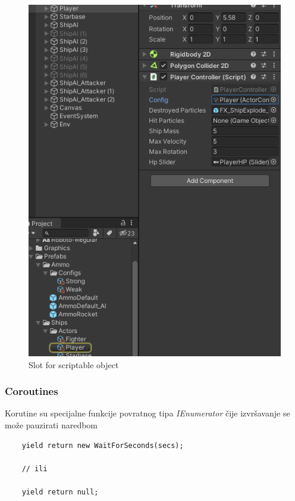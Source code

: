 \begin{center}
    \begin{figure}
        \includegraphics[width=1\textwidth]{Figures/ScriptableObjectSlot.png}
        \caption{Slot for scriptable object}
        \label{fig:scriptableslot}
    \end{figure}
\end{center}

\subsubsection{Coroutines}
\label{sec:coroutines}
Korutine su specijalne funkcije povratnog tipa \emph{IEnumerator} \v{c}ije izvr\v{s}avanje 
se mo\v{z}e pauzirati naredbom 

\begin{verbatim}
    yield return new WaitForSeconds(secs);

    // ili

    yield return null;
\end{verbatim}

